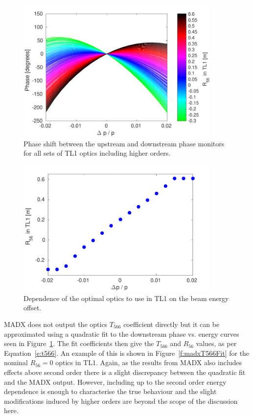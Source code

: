 \begin{figure}
  \centering
  \includegraphics[width=0.9\textwidth]{Figures/propagation/phaseVsEn_t566}
  \caption{Phase shift between the upstream and downstream phase monitors for all sets of TL1 optics including higher orders.}
  \label{f:phaseVsEn_t566}
\end{figure}

\begin{figure}
  \centering
  \includegraphics[width=0.9\textwidth]{Figures/propagation/optR56vsEnergy}
  \caption{Dependence of the optimal optics to use in TL1 on the beam energy offset.}
  \label{f:optR56vsEnergy}
\end{figure}

MADX does not output the optics \(T_{566}\) coefficient directly but it can be approximated using a quadratic fit to the downstream phase vs. energy curves seen in Figure~\ref{f:phaseVsEn_t566}. The fit coefficients then give the \(T_{566}\) and \(R_{56}\) values, as per Equation~\ref{e:t566}. An example of this is shown in Figure~\ref{f:madxT566Fit} for the nominal \(R_{56}=0\) optics in TL1. Again, as the results from MADX also includes effects above second order there is a slight discrepancy between the quadratic fit and the MADX output. However, including up to the second order energy dependence is enough to characterise the true behaviour and the slight modifications induced by higher orders are beyond the scope of the discussion here.

